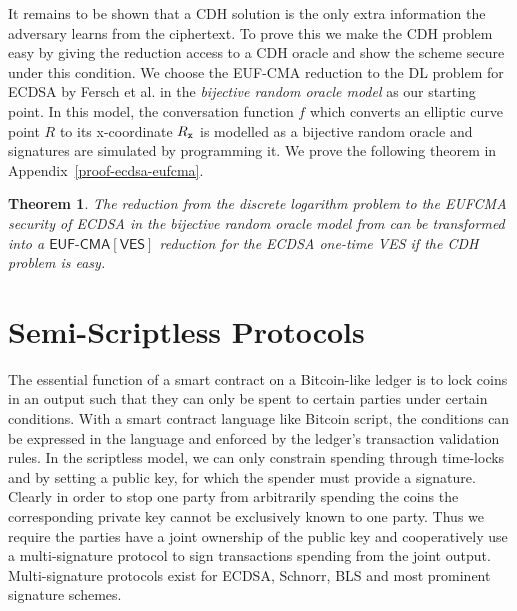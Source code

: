 \documentclass[fullpage]{article}
\newtheorem{theorem}{Theorem}[section]
\theoremstyle{definition}
\newcommand{\EUFCMA}{\textsf{EUF-CMA}\xspace}
\newcommand{\EUFCMAVES}{\textsf{EUF-CMA}[\textsf{VES}]\xspace}
\newcommand{\hatsigma}{\hat{\sigma}}
\newcommand{\DLOG}{\textsf{DL}\xspace}
\begin{document}
It remains to be shown that a CDH solution is the only extra information the adversary learns from the ciphertext. To prove this we make the CDH problem easy by giving the reduction access to a CDH oracle and show the scheme secure under this condition. We choose the \EUFCMA reduction to the \DLOG problem for ECDSA by Fersch et al.\cite{ecdsa-eufcma} in the \emph{bijective random oracle model} as our starting point. In this model, the conversation function $f$ which converts an elliptic curve point $R$ to its x-coordinate $R_\texttt{x}$ is modelled as a bijective random oracle and signatures are simulated by programming it. We prove the following theorem in Appendix~\ref{proof-ecdsa-eufcma}.

\begin{theorem}
\label{claim-ecdsa-eufcma}
The reduction from the discrete logarithm problem to the EUFCMA security of ECDSA in the bijective random oracle model from \cite{ecdsa-eufcma} can be transformed into a $\EUFCMAVES$ reduction for the ECDSA one-time VES if the CDH problem is easy.
\end{theorem}

\section{Semi-Scriptless Protocols}
\label{semi-scriptless}

\newcommand{\TxFund}{\texttt{Tx}_{\textsf{fund}}}
\newcommand{\TxRefund}{\texttt{Tx}_{\textsf{refund}}}
\newcommand{\TxRedeem}{\texttt{Tx}_{\textsf{redeem}}}
\newcommand{\TxInput}{\texttt{Tx}_{\textsf{input}}}
\newcommand{\addrRedeem}{addr_{B}}
\newcommand{\addrRefund}{addr_{A}}
\newcommand{\TxGen}{\textsf{Tx}}
\newcommand{\refundSig}{\sigma_{\textsf{refund}}}
\newcommand{\redeemSig}{\sigma_{\textsf{redeem}}}
\newcommand{\redeemEncSig}{\hatsigma_{\textsf{redeem}}}

The essential function of a smart contract on a Bitcoin-like ledger is to lock coins in an output such that they can only be spent to certain parties under certain conditions. With a smart contract language like Bitcoin script, the conditions can be expressed in the language and enforced by the ledger's transaction validation rules. In the scriptless model, we can only constrain spending through time-locks and by setting a public key, for which the spender must provide a signature. Clearly in order to stop one party from arbitrarily spending the coins the corresponding private key cannot be exclusively known to one party. Thus we require the parties have a joint ownership of the public key and cooperatively use a multi-signature protocol to sign transactions spending from the joint output. Multi-signature protocols exist for ECDSA\cite{Lindell2pECDSA,hash-proof-ecdsa}, Schnorr\cite{musig}, BLS\cite{compact-blockchains-bls} and most prominent signature schemes.
\end{document}
